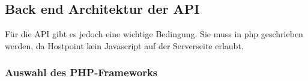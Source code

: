 \subsection{Back end Architektur der API}
Für die API gibt es jedoch eine wichtige Bedingung. Sie muss in php geschrieben werden, da Hostpoint kein Javascript auf der Serverseite erlaubt.



\subsubsection{Auswahl des PHP-Frameworks}



